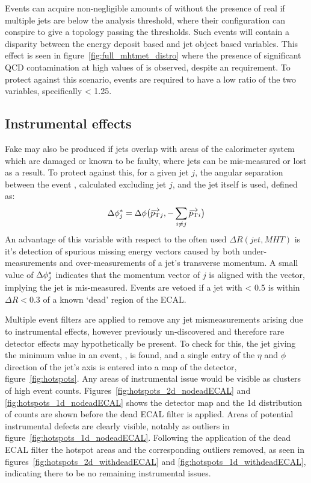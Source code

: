 Events can acquire non-negligible amounts of \mht without the presence of
real \met if multiple jets are below the analysis threshold, where their
configuration can conspire to give a topology passing the \alphat thresholds.
Such events will contain a disparity between the energy deposit based \met and
jet object based \mht variables. This effect is seen in
figure~\ref{fig:full_mhtmet_distro} where the presence of significant QCD
contamination at high values of \mhtmet is observed, despite an \alphat
requirement. To protect against this scenario, events are required to have a low
ratio of the two variables, specifically \mhtmet < 1.25.


\subsection{Instrumental effects}

Fake \mht may also be produced if jets overlap with areas of the calorimeter 
system which are damaged or known to be faulty, where jets can be mis-measured or 
lost as a result. To protect against this, for a given jet $j$, the angular separation
between the event \mht, calculated excluding jet $j$, and the jet itself is used, defined
as:
% 
\begin{equation}
\Delta \phi^*_j = \Delta \phi\big(\overrightarrow{{p_{\text T}}}_j,-\sum_{i\neq j}{\overrightarrow{{p_{\text T}}}_i}\big)
\label{eq:biasdphi}
\end{equation}
% 
An advantage of this variable with respect to the often used
$\Delta R(jet, MHT)$ is it's detection of spurious missing energy vectors caused
by both under-measurements and over-measurements of a jet's transverse momentum.
A small value of $\Delta \phi^*_j$ indicates that the momentum vector of $j$
is aligned with the \mht vector, implying the jet is mis-measured. Events are 
vetoed if a jet with \dphistar< 0.5 is within $\Delta R < 0.3$ of a known
`dead' region of the ECAL.

Multiple event filters are applied to remove any jet mismeasurements arising due
to instrumental effects, however previously un-discovered and
therefore rare detector effects may hypothetically be present. To check
for this, the
jet giving the minimum \dphistar value in an event, \mindphistar, is found,
and a single entry of the $\eta$ and $\phi$ direction of the jet's axis is entered
into a map of the detector, figure~\ref{fig:hotspots}. Any areas of instrumental issue would
be visible as clusters of high event counts. Figures~\ref{fig:hotspots_2d_nodeadECAL} and
\ref{fig:hotspots_1d_nodeadECAL} shows the detector map and the 1d distribution
of counts are shown before the dead ECAL filter is applied. Areas of
potential instrumental defects are clearly visible, notably as outliers in
figure~\ref{fig:hotspots_1d_nodeadECAL}. Following the application of the dead
ECAL filter the hotspot areas and the corresponding outliers removed, as seen in
figures~\ref{fig:hotspots_2d_withdeadECAL} and
\ref{fig:hotspots_1d_withdeadECAL}, indicating there to be no
remaining instrumental issues.

